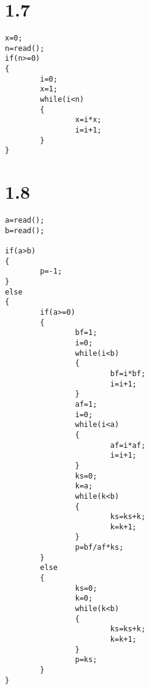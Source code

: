 \documentclass{article}
\begin{document}
\section*{1.7}

\begin{lstlisting}
x=0;
n=read();
if(n>=0)
{
        i=0;
        x=1;
        while(i<n)
        {
                x=i*x;
                i=i+1;
        }
}
\end{lstlisting}

\section*{1.8}

\begin{lstlisting}
a=read();
b=read();

if(a>b)
{
        p=-1;
}
else
{
        if(a>=0)
        {
                bf=1;
                i=0;
                while(i<b)
                {
                        bf=i*bf;
                        i=i+1;
                }
                af=1;
                i=0;
                while(i<a)
                {
                        af=i*af;
                        i=i+1;
                }
                ks=0;
                k=a;
                while(k<b)
                {
                        ks=ks+k;
                        k=k+1;
                }
                p=bf/af*ks;
        }
        else
        {
                ks=0;
                k=0;
                while(k<b)
                {
                        ks=ks+k;
                        k=k+1;
                }
                p=ks;
        }
}
\end{lstlisting}
\end{document}
